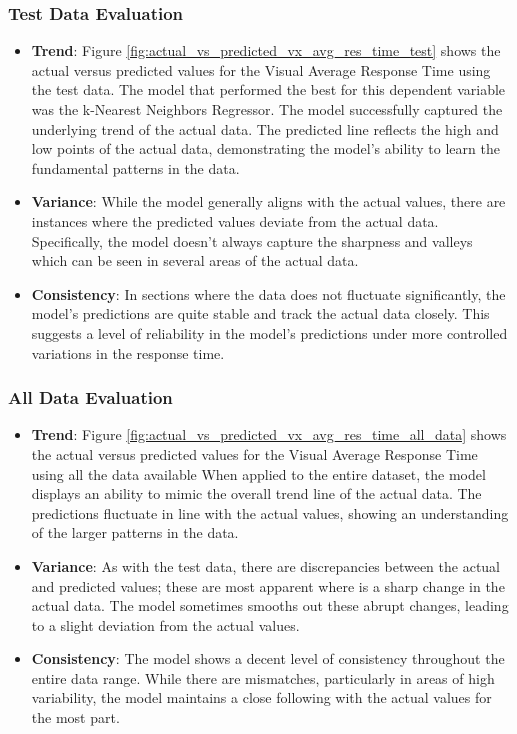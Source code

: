 \subsubsection*{Test Data Evaluation}

\begin{itemize}
    \item \textbf{Trend}: Figure \ref{fig:actual_vs_predicted_vx_avg_res_time_test} shows the actual versus predicted values for the Visual Average Response Time using the test data. 
    The model that performed the best for this dependent variable was the k-Nearest Neighbors Regressor. The model successfully captured the underlying trend of the actual data. The predicted line reflects the high and low points of the actual data, demonstrating the model's ability 
    to learn the fundamental patterns in the data.
    \item \textbf{Variance}: While the model generally aligns with the actual values, there are instances where the predicted values deviate from the actual data. Specifically, the model doesn't
    always capture the sharpness and valleys which can be seen in several areas of the actual data.
    \item \textbf{Consistency}: In sections where the data does not fluctuate significantly, the model's predictions are quite stable and track the actual data closely. This suggests a level
    of reliability in the model's predictions under more controlled variations in the response time.
\end{itemize}

\subsubsection*{All Data Evaluation}

\begin{itemize}
    \item \textbf{Trend}: Figure \ref{fig:actual_vs_predicted_vx_avg_res_time_all_data} shows the actual versus predicted values for the Visual Average Response Time using all the data available
    When applied to the entire dataset, the model displays an ability to mimic the overall trend line of the actual data. The predictions fluctuate in line with the actual values, 
    showing an understanding of the larger patterns in the data.    
    \item \textbf{Variance}: As with the test data, there are discrepancies between the actual and predicted values; these are most apparent where is a sharp change in the actual data.
    The model sometimes smooths out these abrupt changes, leading to a slight deviation from the actual values.    
    \item \textbf{Consistency}: The model shows a decent level of consistency throughout the entire data range. While there are mismatches, particularly in areas of high variability,
    the model maintains a close following with the actual values for the most part.
\end{itemize}

